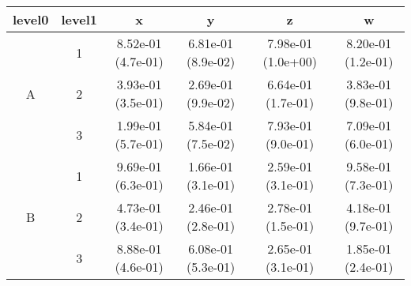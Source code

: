 \begin{tabular}{cccccc}
\toprule
level0 & level1&x&y&z&w\tabularnewline
\midrule
\multirow{3}{*}{A}&1& 8.52e-01 (4.7e-01)& 6.81e-01 (8.9e-02)& 7.98e-01 (1.0e+00)& 8.20e-01 (1.2e-01)\tabularnewline
&2& 3.93e-01 (3.5e-01)& 2.69e-01 (9.9e-02)& 6.64e-01 (1.7e-01)& 3.83e-01 (9.8e-01)\tabularnewline
&3& 1.99e-01 (5.7e-01)& 5.84e-01 (7.5e-02)& 7.93e-01 (9.0e-01)& 7.09e-01 (6.0e-01)\tabularnewline
\midrule
\multirow{3}{*}{B}&1& 9.69e-01 (6.3e-01)& 1.66e-01 (3.1e-01)& 2.59e-01 (3.1e-01)& 9.58e-01 (7.3e-01)\tabularnewline
&2& 4.73e-01 (3.4e-01)& 2.46e-01 (2.8e-01)& 2.78e-01 (1.5e-01)& 4.18e-01 (9.7e-01)\tabularnewline
&3& 8.88e-01 (4.6e-01)& 6.08e-01 (5.3e-01)& 2.65e-01 (3.1e-01)& 1.85e-01 (2.4e-01)\tabularnewline
\bottomrule
\end{tabular}
